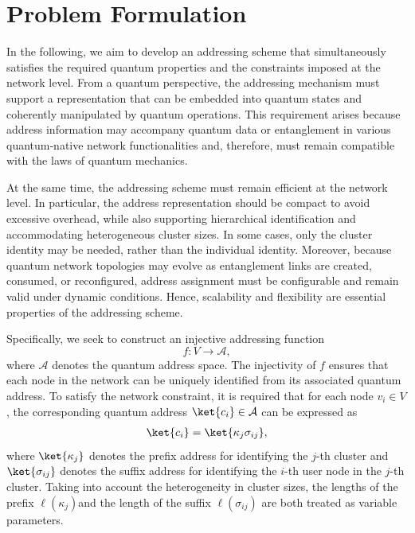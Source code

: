 \documentclass[conference]{IEEEtran}
\begin{document}
\section{Problem Formulation} \label{problem_formulate}

In the following, we aim to develop an addressing scheme that simultaneously satisfies the required quantum properties and the constraints imposed at the network level. From a quantum perspective, the addressing mechanism must support a representation that can be embedded into quantum states and coherently manipulated by quantum operations. This requirement arises because address information may accompany quantum data or entanglement in various quantum‑native network functionalities and, therefore, must remain compatible with the laws of quantum mechanics. 

At the same time, the addressing scheme must remain efficient at the network level. In particular, the address representation should be compact to avoid excessive overhead, while also supporting hierarchical identification and accommodating heterogeneous cluster sizes. In some cases, only the cluster identity may be needed, rather than the individual identity. Moreover, because quantum network topologies may evolve as entanglement links are created, consumed, or reconfigured, address assignment must be configurable and remain valid under dynamic conditions.
Hence, scalability and flexibility are essential properties of the addressing scheme.

Specifically, we seek to construct an injective addressing function
\begin{equation}
    f: V \rightarrow \mathcal{A},
\end{equation}
where $\mathcal{A}$ denotes the quantum address space. The injectivity of $f$
ensures that each node in the network can be uniquely identified from its associated quantum address.
To satisfy the network constraint, it is required that for each node $v_i \in V$, the corresponding quantum address $ \ket{c_i} \in \mathcal{A}$ can be expressed as
\begin{align}
    \ket{c_i}=\ket{\kappa_j \sigma_{ij}}, \label{hier_adrress_structure}
\end{align}
where $\ket{\kappa_j}$ denotes the prefix address for identifying the $j$-th cluster and $\ket{\sigma_{ij}}$ denotes the suffix address for identifying the $i$-th user node in the $j$-th cluster. 
Taking into account the heterogeneity in cluster sizes, the lengths of the prefix $\ell(\kappa_j)$and the length of the suffix $\ell(\sigma_{ij})$ are both treated as variable parameters. 
\end{document}
